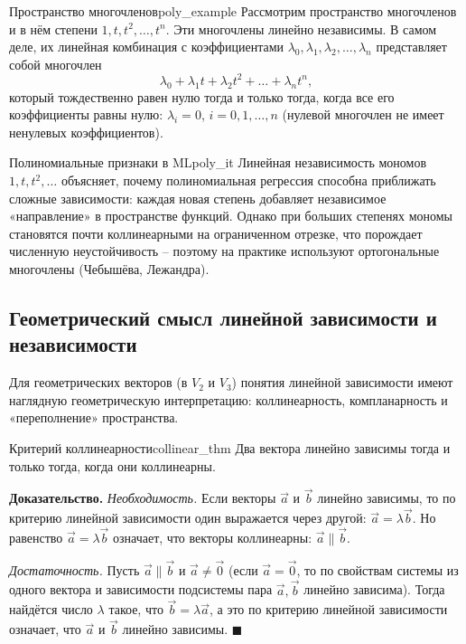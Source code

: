 \documentclass[12pt,a4paper]{article}
\newenvironment{myproof}{\noindent\textbf{Доказательство.}}{\hfill$\blacksquare$}
\begin{document}
\begin{definition}{Пространство многочленов}{poly_example}
  Рассмотрим пространство многочленов и в нём степени $1, t, t^2, \dots,
  t^n$. Эти многочлены линейно независимы. В самом деле, их линейная
  комбинация с коэффициентами $\lambda_0, \lambda_1, \lambda_2, \dots,
  \lambda_n$ представляет собой многочлен
  \[
    \lambda_0 + \lambda_1 t + \lambda_2 t^2 + \dots + \lambda_n t^n,
  \]
  который тождественно равен нулю тогда и только тогда, когда все его
  коэффициенты равны нулю: $\lambda_i = 0$, $i = 0, 1, \dots, n$ (нулевой
  многочлен не имеет ненулевых коэффициентов).
\end{definition}

\begin{remarkIT}{Полиномиальные признаки в ML}{poly_it}
  Линейная независимость мономов $1, t, t^2, \dots$ объясняет, почему
  полиномиальная регрессия способна приближать сложные зависимости:
  каждая новая степень добавляет независимое «направление» в пространстве
  функций. Однако при больших степенях мономы становятся почти
  коллинеарными на ограниченном отрезке, что порождает численную
  неустойчивость -- поэтому на практике используют ортогональные
  многочлены (Чебышёва, Лежандра).
\end{remarkIT}

\subsection*{Геометрический смысл линейной зависимости и независимости}

Для геометрических векторов (в $V_2$ и $V_3$) понятия линейной
зависимости имеют наглядную геометрическую интерпретацию: коллинеарность,
компланарность и «переполнение» пространства.

\begin{theorem}{Критерий коллинеарности}{collinear_thm}
  Два вектора линейно зависимы тогда и только тогда, когда они
  коллинеарны.
\end{theorem}

\begin{myproof}
  \textit{Необходимость.} Если векторы $\vec{a}$ и $\vec{b}$ линейно
  зависимы, то по критерию линейной зависимости один выражается через
  другой: $\vec{a} = \lambda\vec{b}$. Но равенство $\vec{a} =
  \lambda\vec{b}$ означает, что векторы коллинеарны: $\vec{a} \parallel
  \vec{b}$.

  \textit{Достаточность.} Пусть $\vec{a} \parallel \vec{b}$ и $\vec{a}
  \neq \vec{0}$ (если $\vec{a} = \vec{0}$, то по свойствам системы из
    одного вектора и зависимости подсистемы пара $\vec{a}, \vec{b}$ линейно
  зависима). Тогда найдётся число $\lambda$ такое, что $\vec{b} =
  \lambda\vec{a}$, а это по критерию линейной зависимости означает, что
  $\vec{a}$ и $\vec{b}$ линейно зависимы.
\end{myproof}
\end{document}
